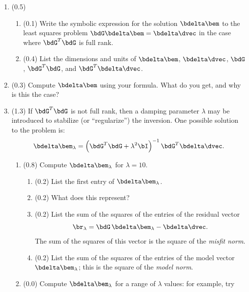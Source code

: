 \documentclass[11pt,titlepage,fleqn]{article}
\begin{document}
\begin{enumerate}
\item (0.5)
\begin{enumerate}
\item (0.1) Write the symbolic expression for the solution $\bdelta\bem$ to the least squares problem $\bdG\bdelta\bem=\bdelta\dvec$ in the case where $\bdG^T\bdG$ is full rank.

\item (0.4) List the dimensions and units of $\bdelta\bem$, $\bdelta\dvec$, $\bdG$, $\bdG^T\bdG$, and $\bdG^T\bdelta\dvec$.
\end{enumerate}


\item (0.3) Compute $\bdelta\bem$ using your formula.  What do you get, and why is this the case?


\item (1.3) If $\bdG^T\bdG$ is not full rank, then a damping parameter $\lambda$ may be introduced to stabilize (or ``regularize'') the inversion.  One possible solution to the problem is:
%
\begin{equation}
\bdelta\bem_{\lambda} = \left(\bdG^T\bdG+\lambda^2\bI\right)^{-1}\bdG^T\bdelta\dvec.
\end{equation}
%
\begin{enumerate}

\item (0.8) Compute $\bdelta\bem_{\lambda}$ for $\lambda = 10$.
%
\begin{enumerate}
\item (0.2) List the first entry of $\bdelta\bem_{\lambda}$.
\item (0.2) What does this represent?
\item (0.2) List the sum of the squares of the entries of the residual vector
%
\begin{equation}
\br_\lambda = \bdG\,\bdelta\bem_\lambda-\bdelta\dvec.
\end{equation}
%
The sum of the squares of this vector is the square of the {\em misfit norm}.
\item (0.2) List the sum of the squares of the entries of the model vector $\bdelta\bem_{\lambda}$; this is the square of the {\em model norm}.
\end{enumerate}


\item (0.0) Compute $\bdelta\bem_{\lambda}$ for a range of $\lambda$ values: for example, try


\end{enumerate}
\end{enumerate}
\end{document}
